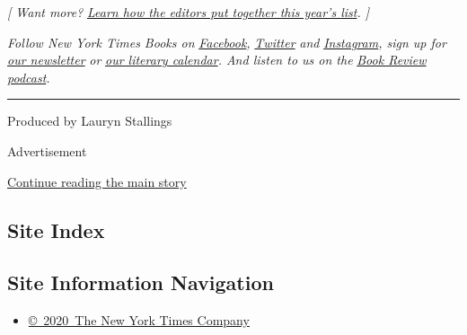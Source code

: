 \emph{{[} Want more?}
\href{https://www.nytimes3xbfgragh.onion/2019/11/22/reader-center/inside-the-times-10-best-list.html}{\emph{Learn
how the editors put together this year's list}}\emph{. {]}}

\emph{Follow New York Times Books on}
\href{https://www.facebookcorewwwi.onion/nytbooks/}{\emph{Facebook}}\emph{,}
\href{https://twitter.com/nytimesbooks}{\emph{Twitter}} \emph{and}
\href{https://www.instagram.com/nytbooks/}{\emph{Instagram}}\emph{, sign
up for}
\href{https://www.nytimes3xbfgragh.onion/newsletters/books-review}{\emph{our
newsletter}} \emph{or}
\href{https://www.nytimes3xbfgragh.onion/interactive/2017/books/books-calendar.html}{\emph{our
literary calendar}}\emph{. And listen to us on the}
\href{https://www.nytimes3xbfgragh.onion/column/book-review-podcast}{\emph{Book
Review podcast}}\emph{.}

\begin{center}\rule{0.5\linewidth}{\linethickness}\end{center}

Produced by Lauryn Stallings

Advertisement

\protect\hyperlink{after-bottom}{Continue reading the main story}

\hypertarget{site-index}{%
\subsection{Site Index}\label{site-index}}

\hypertarget{site-information-navigation}{%
\subsection{Site Information
Navigation}\label{site-information-navigation}}

\begin{itemize}
\tightlist
\item
  \href{https://help.nytimes3xbfgragh.onion/hc/en-us/articles/115014792127-Copyright-notice}{©~2020~The
  New York Times Company}
\end{itemize}


